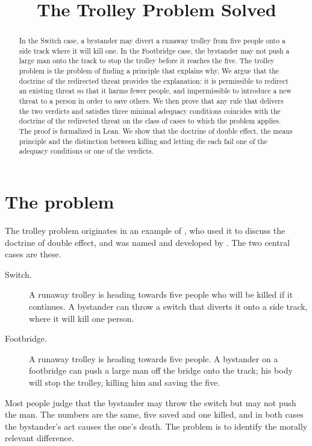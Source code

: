 \documentclass{situationist-preprint}
\title{The Trolley Problem Solved}
\begin{document}
\maketitle

\begin{abstract}
In the Switch case, a bystander may divert a runaway trolley from five people onto a side track where it will kill one. In the Footbridge case, the bystander may not push a large man onto the track to stop the trolley before it reaches the five. The trolley problem is the problem of finding a principle that explains why. We argue that the doctrine of the redirected threat provides the explanation: it is permissible to redirect an existing threat so that it harms fewer people, and impermissible to introduce a new threat to a person in order to save others. We then prove that any rule that delivers the two verdicts and satisfies three minimal adequacy conditions coincides with the doctrine of the redirected threat on the class of cases to which the problem applies. The proof is formalized in Lean. We show that the doctrine of double effect, the means principle and the distinction between killing and letting die each fail one of the adequacy conditions or one of the verdicts.
\end{abstract}

\section{The problem}

The trolley problem originates in an example of \citet{Foot1967}, who used it to discuss the doctrine of double effect, and was named and developed by \citet{Thomson1976,Thomson1985}. The two central cases are these.

\begin{description}
\item[Switch.] A runaway trolley is heading towards five people who will be killed if it continues. A bystander can throw a switch that diverts it onto a side track, where it will kill one person.
\item[Footbridge.] A runaway trolley is heading towards five people. A bystander on a footbridge can push a large man off the bridge onto the track; his body will stop the trolley, killing him and saving the five.
\end{description}

Most people judge that the bystander may throw the switch but may not push the man. The numbers are the same, five saved and one killed, and in both cases the bystander's act causes the one's death. The problem is to identify the morally relevant difference.
\end{document}
